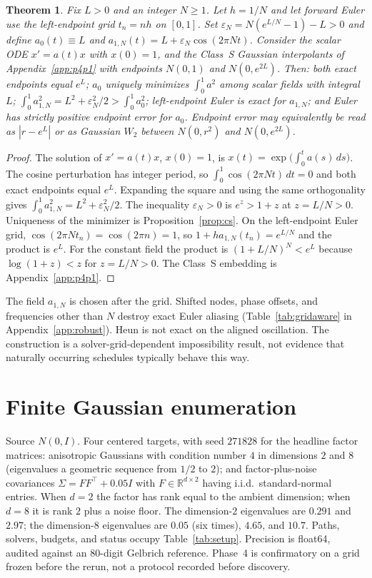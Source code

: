\documentclass[11pt,a4paper]{article}
\newcommand{\numLrTwoMin}{0.291}
\newcommand{\numLrTwoMax}{2.97}
\newcommand{\numLrEightA}{4.65}
\newcommand{\numLrEightB}{10.7}
\newtheorem{theorem}{Theorem}
\theoremstyle{remark}
\newcommand{\wtwo}{W_2}
\newcommand{\RR}{\mathbb{R}}
\begin{document}
\begin{theorem}
\label{thm:gridaware}
Fix $L>0$ and an integer $N\ge 1$. Let $h=1/N$ and let forward Euler use
the left-endpoint grid $t_n=nh$ on $[0,1]$. Set
$\varepsilon_N=N(e^{L/N}-1)-L>0$ and define $a_0(t)\equiv L$ and
$a_{1,N}(t)=L+\varepsilon_N\cos(2\pi Nt)$. Consider the scalar ODE
$x'=a(t)x$ with $x(0)=1$, and the Class~S Gaussian interpolants of
Appendix~\ref{app:p4p1} with endpoints $N(0,1)$ and $N(0,e^{2L})$. Then:
both exact endpoints equal $e^{L}$; $a_0$ uniquely minimizes
$\int_0^1 a^2$ among scalar fields with integral $L$;
$\int_0^1 a_{1,N}^2=L^2+\varepsilon_N^2/2>\int_0^1 a_0^2$; left-endpoint
Euler is exact for $a_{1,N}$; and Euler has strictly positive endpoint
error for $a_0$. Endpoint error may equivalently be read as
$|r-e^{L}|$ or as Gaussian $\wtwo$ between $N(0,r^2)$ and $N(0,e^{2L})$.
\end{theorem}

\begin{proof}
The solution of $x'=a(t)x$, $x(0)=1$, is
$x(t)=\exp\bigl(\int_0^t a(s)\,ds\bigr)$. The cosine perturbation has
integer period, so $\int_0^1\cos(2\pi Nt)\,dt=0$ and both exact endpoints
equal $e^{L}$. Expanding the square and using the same orthogonality gives
$\int_0^1 a_{1,N}^2=L^2+\varepsilon_N^2/2$. The inequality
$\varepsilon_N>0$ is $e^z>1+z$ at $z=L/N>0$. Uniqueness of the
minimizer is Proposition~\ref{prop:cs}. On the left-endpoint Euler grid,
$\cos(2\pi Nt_n)=\cos(2\pi n)=1$, so
$1+h a_{1,N}(t_n)=e^{L/N}$ and the product is $e^{L}$. For the constant
field the product is $(1+L/N)^N<e^{L}$ because $\log(1+z)<z$ for
$z=L/N>0$. The Class~S embedding is Appendix~\ref{app:p4p1}.
\end{proof}

The field $a_{1,N}$ is chosen after the grid. Shifted nodes, phase
offsets, and frequencies other than $N$ destroy exact Euler aliasing
(Table~\ref{tab:gridaware} in Appendix~\ref{app:robust}). Heun is not
exact on the aligned oscillation. The construction is a
solver-grid-dependent impossibility result, not evidence that naturally
occurring schedules typically behave this way.

\section{Finite Gaussian enumeration}
\label{sec:experiments}

Source $N(0,I)$. Four centered targets, with seed $271828$ for the
headline factor matrices: anisotropic Gaussians with condition number
$4$ in dimensions $2$ and $8$ (eigenvalues a geometric sequence from
$1/2$ to $2$); and factor-plus-noise covariances
$\Sigma=FF^\top+0.05 I$ with $F\in\RR^{d\times 2}$ having i.i.d.\
standard-normal entries. When $d=2$ the factor has rank equal to the
ambient dimension; when $d=8$ it is rank $2$ plus a noise floor. The
dimension-$2$ eigenvalues are $\numLrTwoMin$ and $\numLrTwoMax$; the
dimension-$8$ eigenvalues are $0.05$ (six times), $\numLrEightA$, and
$\numLrEightB$. Paths, solvers, budgets, and status occupy
Table~\ref{tab:setup}. Precision is float64, audited against an
$80$-digit Gelbrich reference. Phase~4 is confirmatory on a grid frozen
before the rerun, not a protocol recorded before discovery.
\end{document}
